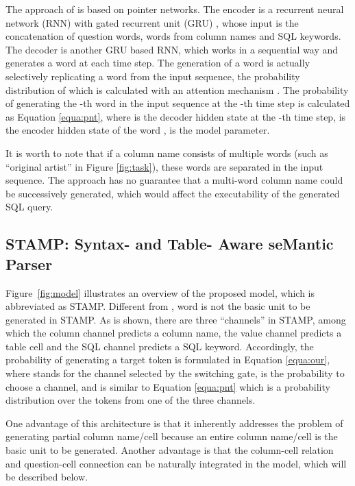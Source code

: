 \documentclass[11pt,a4paper]{article}
\begin{document}
The approach of  is based on pointer networks.
The encoder is a \mbox{recurrent} neural network (RNN) with gated recurrent unit (GRU) \cite{cho-EtAl:2014:EMNLP2014}, whose input is the concatenation of question words, words from column names and SQL keywords.
The decoder is another GRU based RNN, which works in a sequential way and generates a word at each time step.
The generation of a word is actually selectively replicating a word from the input sequence, the probability distribution
of which is calculated with an attention mechanism \cite{Bahdanau2015}.
The probability of generating the -th word  in the input sequence at the -th time step is calculated as Equation \ref{equa:pnt}, where  is the decoder hidden state at the -th time step,  is the encoder hidden state of the word ,  is the model parameter.

It is worth to note that if a column name consists of multiple words (such as ``original artist'' in Figure \ref{fig:task}), these words are separated in the input sequence.
The approach has no guarantee that a multi-word column name could be successively generated,
which would affect the executability of the generated SQL query.





\subsection{{STAMP}: Syntax- and Table- Aware seMantic Parser }
\label{sec:framework}
Figure~\ref{fig:model} illustrates an overview of the proposed model, which is abbreviated as STAMP.
Different from , word is not the basic unit to be generated in STAMP.
As is shown, there are three ``channels'' in STAMP, among which the column channel predicts a column name, the value channel predicts a table cell and the SQL channel predicts a SQL keyword.
Accordingly, the probability of generating a target token is formulated in Equation \ref{equa:our}, where  stands for the channel selected by the switching gate,  is the probability to choose a channel, and  is similar to Equation \ref{equa:pnt} which is a probability distribution over the tokens from one of the three channels.

One advantage of this architecture is that it inherently addresses the problem of generating partial column name/cell because an entire column name/cell is the basic unit to be generated.
Another advantage is that the column-cell relation and question-cell connection
can be naturally integrated in the model, which will be described below.
\end{document}
